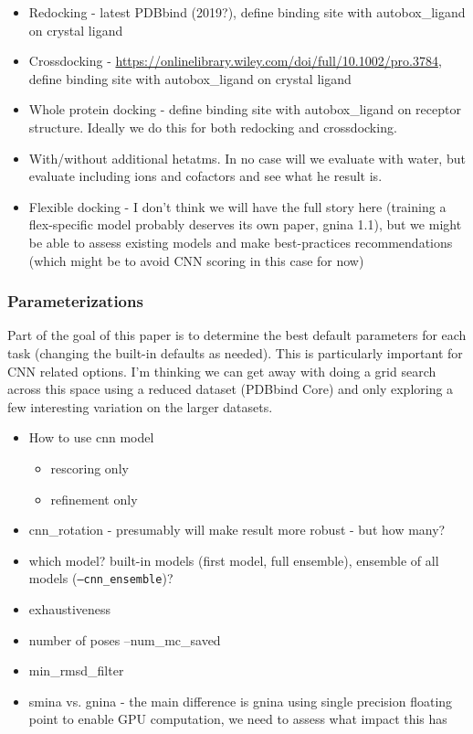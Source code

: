 \documentclass[journal=jcisd8,manuscript=article]{achemso}
\begin{document}
\begin{itemize}
    \item Redocking - latest PDBbind (2019?), define binding site with autobox\_ligand on crystal ligand
    \item Crossdocking - \url{https://onlinelibrary.wiley.com/doi/full/10.1002/pro.3784}, define binding site with autobox\_ligand on crystal ligand
    \item Whole protein docking - define binding site with autobox\_ligand on receptor structure.  Ideally we do this for both redocking and crossdocking.
    \item With/without additional hetatms.  In no case will we evaluate with water, but evaluate including ions and cofactors and see what he result is.
    \item Flexible docking - I don't think we will have the full story here (training a flex-specific model probably deserves its own paper, gnina 1.1), but we might be able to assess existing models and make best-practices recommendations (which might be to avoid CNN scoring in this case for now)
\end{itemize}

\subsubsection{Parameterizations}
Part of the goal of this paper is to determine the best default parameters for each task (changing the built-in defaults as needed).  This is particularly important for CNN related options.  I'm thinking we can get away with doing a grid search across this space using a reduced dataset (PDBbind Core) and only exploring a few interesting variation on the larger datasets.

\begin{itemize}
    \item How to use cnn model 
    \begin{itemize}
        \item rescoring only
        \item refinement only
    \end{itemize}
    \item cnn\_rotation - presumably will make result more robust - but how many?
    \item which model? built-in models (first model, full ensemble), ensemble of all models (\texttt{--cnn\_ensemble})?
  \item exhaustiveness
  \item number of poses  --num\_mc\_saved
  \item min\_rmsd\_filter
  \item smina vs. gnina - the main difference is gnina using single precision floating point to enable GPU computation, we need to assess what impact this has
\end{itemize}
\end{document}
